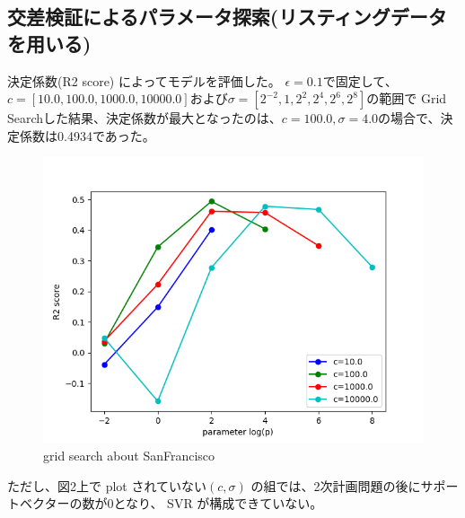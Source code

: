 \documentclass{jsarticle}
\begin{document}
\subsection{交差検証によるパラメータ探索(リスティングデータを用いる)}
決定係数(R2 score) によってモデルを評価した。
$\epsilon=0.1$で固定して、
$c = [10.0, 100.0, 1000.0, 10000.0]$および$\sigma=[2^{-2}, 1, 2^2, 2^4, 2^6, 2^8]$の範囲で
Grid Searchした結果、決定係数が最大となったのは、$c=100.0, \sigma=4.0$の場合で、決定係数は0.4934であった。
\begin{figure}[!h]
\includegraphics[width=15cm]{grid_sanfrancisco.png}
\caption{grid search about SanFrancisco}
\end{figure}
ただし、図2上で plot されていない$(c,　\sigma)$ の組では、2次計画問題の後にサポートベクターの数が0となり、
SVR が構成できていない。

\clearpage
\end{document}
